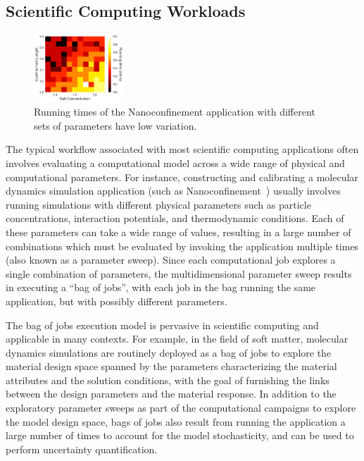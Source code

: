 \vspace*{\subsecspace}
\subsection{Scientific Computing Workloads}


\begin{figure}[t]
  \centering 
  \includegraphics[width=0.3\textwidth]{../graphs/hmap.png}
    \vspace*{\myfigspace}
  \caption{Running times of the Nanoconfinement application with different sets of parameters have low variation.}
  \label{fig:heatmap}
  \vspace*{\myfigspace}
\end{figure}


The typical workflow associated with most scientific computing applications often involves evaluating a computational model across a wide range of physical and computational parameters.
For instance, constructing and calibrating a molecular dynamics simulation application (such as Nanoconfinement~\cite{jing2015ionic,kadupitiya2017,anousheh2020ionic}) usually involves running simulations with different physical parameters such as particle concentrations, interaction potentials, and thermodynamic conditions. 
Each of these parameters can take a wide range of values, resulting in a large number of combinations which must be evaluated by invoking the application multiple times (also known as a parameter sweep). 
Since each computational job explores a single combination of parameters, the multidimensional parameter sweep results in executing a ``bag of jobs'', with each job in the bag running the same application, but with possibly different parameters.


The bag of jobs execution model is pervasive in scientific computing and applicable in many contexts. For example, in the field of soft matter, molecular dynamics simulations are routinely deployed as a bag of jobs to explore the material design space spanned by the parameters characterizing the material attributes and the solution conditions, with the goal of furnishing the links between the design parameters and the material response.
In addition to the exploratory parameter sweeps as part of the computational campaigns to explore the model design space, bags of jobs also result from running the application a large number of times to account for the model stochasticity, and can be used to %
perform uncertainty quantification.

